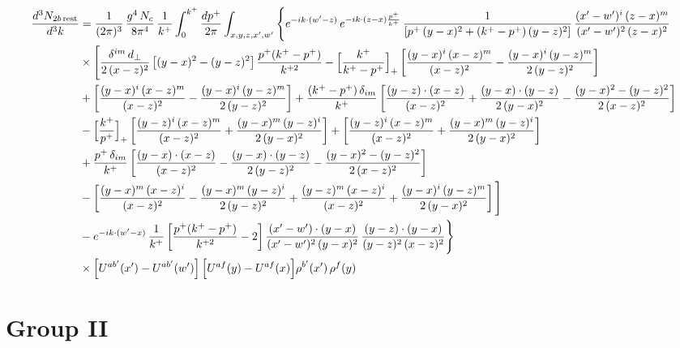 \documentclass[9pt]{article}
\numberwithin{equation}{section}
\begin{document}
\begin{align}
\frac{d^{3}N_{2b\,\rm rest}}{d^{3}k} & =\frac{1}{(2\pi)^{3}}\,\frac{g^{4}\,N_{c}}{8\pi^{4}}\,\frac{1}{k^{+}}\int_{0}^{k^{+}}\frac{dp^{+}}{2\pi}\int_{x,y,z,x',w'}\Bigg\{e^{-ik\cdot(w'-z)}\,e^{-ik\cdot(z-x)\frac{p^{+}}{k^{+}}}\,\frac{1}{\left[p^{+}\,(y-x)^{2}+(k^{+}-p^{+})\,(y-z)^{2}\right]}\,\frac{(x'-w')^{i}\,(z-x)^{m}}{(x'-w')^{2}\,(z-x)^{2}}\notag\\
&\times\Bigg[\frac{\delta^{im}\,d_{\perp}}{2\,(x-z)^{2}}\left[(y-x)^{2}-(y-z)^{2}\right]\frac{p^{+}(k^{+}-p^{+})}{k^{+2}}
-\Big[\frac{k^{+}}{k^{+}-p^{+}}\Big]_{+}\left[\frac{(y-x)^{i}\,(x-z)^{m}}{(x-z)^{2}}-\frac{(y-x)^{i}\,(y-z)^{m}}{2\,(y-z)^{2}}\right]\notag\\
&+\left[\frac{(y-x)^{i}\,(x-z)^{m}}{(x-z)^{2}}-\frac{(y-x)^{i}\,(y-z)^{m}}{2\,(y-z)^{2}}\right]
+\frac{(k^{+}-p^{+})\,\delta_{im}}{k^{+}}\left[\frac{(y-z)\cdot(x-z)}{(x-z)^{2}}+\frac{(y-x)\cdot(y-z)}{2\,(y-x)^{2}}-\frac{(y-x)^{2}-(y-z)^{2}}{2\,(x-z)^{2}}\right]\notag\\
&-\Big[\frac{k^{+}}{p^{+}}\Big]_{+}\left[\frac{(y-z)^{i}\,(x-z)^{m}}{(x-z)^{2}}+\frac{(y-x)^{m}\,(y-z)^{i}}{2\,(y-x)^{2}}\right]+\left[\frac{(y-z)^{i}\,(x-z)^{m}}{(x-z)^{2}}+\frac{(y-x)^{m}\,(y-z)^{i}}{2\,(y-x)^{2}}\right]\notag\\
&+\frac{p^{+}\,\delta_{im}}{k^{+}}\left[\frac{(y-x)\cdot(x-z)}{(x-z)^{2}}-\frac{(y-x)\cdot(y-z)}{2\,(y-z)^{2}}-\frac{(y-x)^{2}-(y-z)^{2}}{2\,(x-z)^{2}}\right]\notag\\
&-\left[\frac{(y-x)^{m}\,(x-z)^{i}}{(x-z)^{2}}-\frac{(y-x)^{m}\,(y-z)^{i}}{2\,(y-z)^{2}}+\frac{(y-z)^{m}\,(x-z)^{i}}{(x-z)^{2}}+\frac{(y-x)^{i}\,(y-z)^{m}}{2\,(y-x)^{2}}\right]\Bigg]\notag\\
&-e^{-ik\cdot(w'-x)}\,\frac{1}{k^{+}}\left[\frac{p^{+}(k^{+}-p^{+})}{k^{+2}}-2\right]\frac{(x'-w')\cdot(y-x)}{(x'-w')^{2}\,(y-x)^{2}}\,\frac{(y-z)\cdot(y-x)}{(y-z)^{2}\,(x-z)^{2}}\Bigg\}\notag\\
&\times\Big[U^{ab'}(x')-U^{ab'}(w')\Big]\,\Big[U^{af}(y)-U^{af}(x)\Big]\rho^{b'}(x')\,\rho^{f}(y)
\end{align}

\section{Group II}
\end{document}
